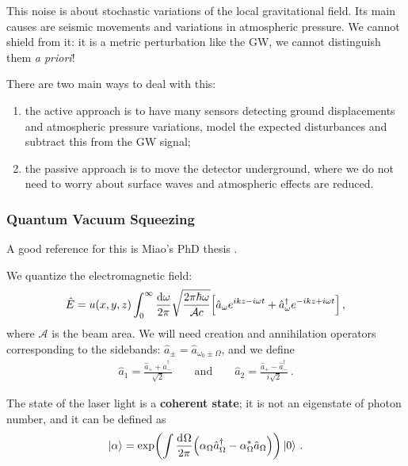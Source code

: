 \documentclass[main.tex]{subfiles}
\begin{document}
This noise is about stochastic variations of the local gravitational field. Its main causes are seismic movements and variations in atmospheric pressure. 
We cannot shield from it: it is a metric perturbation like the GW, we cannot distinguish them \emph{a priori}! 

There are two main ways to deal with this: 
\begin{enumerate}
    \item the active approach is to have many sensors detecting ground displacements and atmospheric pressure variations, model the expected disturbances and subtract this from the GW signal;
    \item the passive approach is to move the detector underground, where we do not need to worry about surface waves and atmospheric effects are reduced.
\end{enumerate}

\subsubsection{Quantum Vacuum Squeezing}

A good reference for this is Miao's PhD thesis \cite[sec.\ 2.8]{miaoExploringMacroscopicQuantum2010}.

We quantize the electromagnetic field: 
%
\begin{align}
\hat{E} = u(x,y,z) \int_{0}^{\infty } \frac{ \dd{\omega }}{2 \pi }
\sqrt{\frac{2 \pi \hbar \omega }{\mathcal{A} c}}
\qty[ \hat{a}_{\omega } e^{ikz - i \omega t} + \hat{a}^\dag_{\omega } e^{-ikz + i \omega t}]
\,,
\end{align}
%
where \(\mathcal{A}\) is the beam area. 
We will need creation and annihilation operators corresponding to the sidebands: \(\hat{a}_{\pm}= \hat{a}_{\omega_0 \pm\Omega }\), and we define 
%
\begin{align}
\hat{a}_{1} = \frac{\hat{a}_{+} + \hat{a}^\dag_{-}}{\sqrt{2}}
\qquad \text{and} \qquad
\hat{a}_{2} = \frac{\hat{a}_{+} - \hat{a}^\dag_{-}}{i \sqrt{2}}
\,.
\end{align}

The state of the laser light is a \textbf{coherent state}; it is not an eigenstate of photon number, and it can be defined as 
%
\begin{align}
\ket{\alpha } = \exp(\int \frac{ \dd[]{\Omega }}{2 \pi } \qty(\alpha _{\Omega } \hat{a} ^\dag_{\Omega } - \alpha^{*}_{\Omega } \hat{a}_{\Omega })) \ket{0 }
\,.
\end{align}
\end{document}
